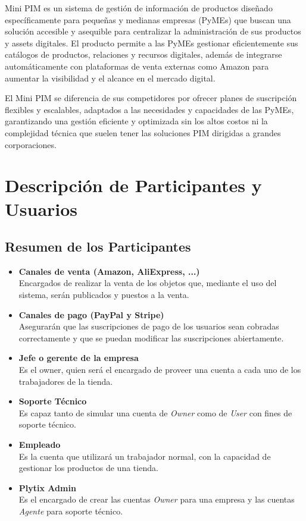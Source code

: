 \documentclass[12pt.a4paper]{article}
\begin{document}
Mini PIM es un sistema de gestión de información de productos diseñado específicamente para pequeñas y medianas empresas (PyMEs) que buscan una solución accesible y asequible para centralizar la administración de sus productos y assets digitales. El producto permite a las PyMEs gestionar eficientemente sus catálogos de productos, relaciones y recursos digitales, además de integrarse automáticamente con plataformas de venta externas como Amazon para aumentar la visibilidad y el alcance en el mercado digital.

El Mini PIM se diferencia de sus competidores por ofrecer planes de suscripción flexibles y escalables, adaptados a las necesidades y capacidades de las PyMEs, garantizando una gestión eficiente y optimizada sin los altos costos ni la complejidad técnica que suelen tener las soluciones PIM dirigidas a grandes corporaciones.


\section{Descripción de Participantes y Usuarios}

\subsection{Resumen de los Participantes}

\begin{itemize}

    \item \textbf{Canales de venta (Amazon, AliExpress, ...)} \\
        Encargados de realizar la venta de los objetos que, mediante el uso del sistema, serán publicados y puestos a la venta.
    \item \textbf{Canales de pago (PayPal y Stripe)} \\
        Asegurarán que las suscripciones de pago de los usuarios sean cobradas correctamente y que se puedan modificar las suscripciones abiertamente.
    \item \textbf{Jefe o gerente de la empresa} \\
        Es el owner, quien será el encargado de proveer una cuenta a cada uno de los trabajadores de la tienda.
    \item \textbf{Soporte Técnico} \\
        Es capaz tanto de simular una cuenta de \textit{Owner} como de \textit{User} con fines de soporte técnico.
    \item \textbf{Empleado} \\
        Es la cuenta que utilizará un trabajador normal, con la capacidad de gestionar los productos de una tienda.
    \item \textbf{Plytix Admin} \\
        Es el encargado de crear las cuentas \textit{Owner} para una empresa y las cuentas \textit{Agente} para soporte técnico.
\end{itemize}
\end{document}

